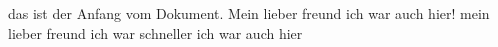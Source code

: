 das ist der Anfang vom Dokument.
Mein lieber freund ich war auch hier!
mein lieber freund ich war schneller ich war auch hier
